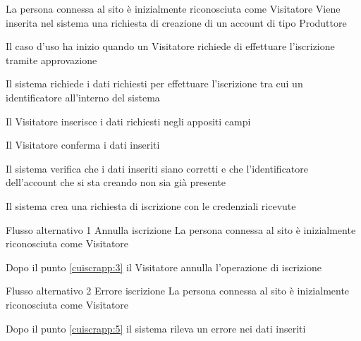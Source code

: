 \tabcuvspace

{}
{La persona connessa al sito è inizialmente riconosciuta come Visitatore}
{Viene inserita nel sistema una richiesta di creazione di un account di tipo Produttore}
{\begin{enumCU}
	\item Il caso d'uso ha inizio quando un Visitatore richiede di effettuare l'iscrizione tramite approvazione
	\item Il sistema richiede i dati richiesti per effettuare l'iscrizione  tra cui un identificatore all'interno del sistema
	\item Il Visitatore inserisce i dati richiesti negli appositi campi \label{cuiscrapp:3}
	\item Il Visitatore conferma i dati inseriti
	\item Il sistema verifica che i dati inseriti siano corretti e che l'identificatore dell'account che si sta creando non sia già presente \label{cuiscrapp:5}
	\item Il sistema crea una richiesta di iscrizione con le credenziali ricevute
\end{enumCU}}
%
{Flusso alternativo 1}%
{Annulla iscrizione}%
{La persona connessa al sito è inizialmente riconosciuta come Visitatore}%
{\postNulle}%
{\begin{enumCU}
		\item Dopo il punto \ref{cuiscrapp:3} il Visitatore annulla l'operazione di iscrizione
	\end{enumCU}}%
%
{Flusso alternativo 2}%
{Errore iscrizione}%
{La persona connessa al sito è inizialmente riconosciuta come Visitatore}%
{\postNulle}%
{\begin{enumCU}
		\item Dopo il punto \ref{cuiscrapp:5} il sistema rileva un errore nei dati inseriti
	\end{enumCU}}%

\tabcuvspace


